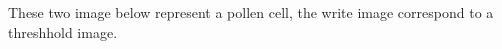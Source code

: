 These two image below represent a pollen cell, the write image correspond to a threshhold image.
    